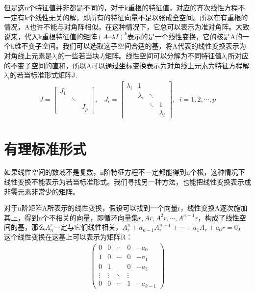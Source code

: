 	但是这n个特征值并非都是不同的，对于k重根的特征值，对应的齐次线性方程不一定有k个线性无关的解，即所有的特征向量不足以张成全空间。所以在有重根的情况，A也许不能与对角阵相似。在这种情况下，它总可以表示为准对角阵。大致说来，代入k重根特征值的矩阵$ (A –\lambda I)^k $表示的是一个线性变换，它的核是A的一个k维不变子空间。我们可以选取这子空间合适的基，将A代表的线性变换表示为对角线上元素是$ \lambda_i $的一些若当块$ J_i $矩阵。线性空间可以分解为不同特征值$ \lambda_i $所对应的不变子空间的直和，所以A可以通过坐标变换表示为对角线上元素为特征方程解$ \lambda_i $的若当标准形式矩阵J.
	\begin{gather*}
		J={\begin{bmatrix}J_{1}&\;&\;\\\;&\ddots &\;\\\;&\;&J_{p}\end{bmatrix}},  \;\;\; J_{i} = {\begin{bmatrix}\lambda _{i} &1&\;&\;\\\;&\lambda _{i}&\ddots &\;\\\;&\;&\ddots &1\\\;&\;&\;&\lambda _{i}\end{bmatrix}}, \;\;i=1,2,\cdots,p
	\end{gather*}

	\section{有理标准形式}
	
	如果线性空间的数域不是复数，n阶特征方程不一定都能得到n个根，这种情况下线性变换不能表示为若当标准形式。我们寻找另一种方法，也能把线性变换表示成非零元素非常少的矩阵。
	
	对于n阶矩阵A所表示的线性变换，假设可以找到一个向量r，线性变换A逐次施加其上，得到n个不相关的向量，即循环向量集$ {r , Ar, A^2r, \cdots, A^{n-1}r} $，构成了线性空间的基，那么$ A_{n}^{r} $一定与它们线性相关，$ A^{n}_{r} +a_{n-1} A^{n-1}_r + \cdots + a_1A_r+ a_0r = 0 $，这个线性变换在这基上可以表示为矩阵R：
	\begin{gather*}
		\begin{pmatrix}0 &0& \cdots &0& -a_{0}\\ 1 &0& \cdots &0& -a_{1}\\ 0 &1&  &0& -a_{2}\\  \vdots & \vdots &\ddots & \vdots\\ 0 &0& \cdots & 1& -a_{k-1} \end{pmatrix}
	\end{gather*}

